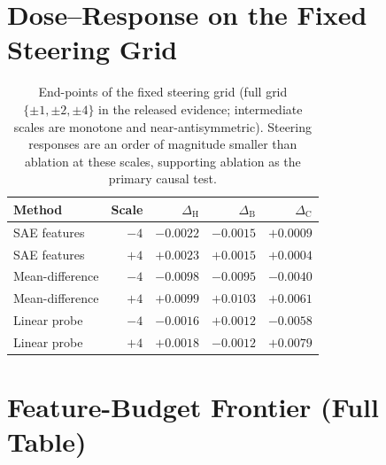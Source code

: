 \documentclass[11pt]{article}
\newcommand{\dH}{\ensuremath{\Delta_{\mathrm{H}}}}
\newcommand{\dB}{\ensuremath{\Delta_{\mathrm{B}}}}
\newcommand{\dC}{\ensuremath{\Delta_{\mathrm{C}}}}
\begin{document}
\section{Dose--Response on the Fixed Steering Grid}
\label{app:dose}

\begin{table}[h]
\centering
\footnotesize
\setlength{\tabcolsep}{4pt}
\begin{tabular}{@{}lrrrr@{}}
\toprule
Method & Scale & \dH{} & \dB{} & \dC{} \\
\midrule
SAE features & $-4$ & $-0.0022$ & $-0.0015$ & $+0.0009$ \\
SAE features & $+4$ & $+0.0023$ & $+0.0015$ & $+0.0004$ \\
Mean-difference & $-4$ & $-0.0098$ & $-0.0095$ & $-0.0040$ \\
Mean-difference & $+4$ & $+0.0099$ & $+0.0103$ & $+0.0061$ \\
Linear probe & $-4$ & $-0.0016$ & $+0.0012$ & $-0.0058$ \\
Linear probe & $+4$ & $+0.0018$ & $-0.0012$ & $+0.0079$ \\
\bottomrule
\end{tabular}
\caption{End-points of the fixed steering grid (full grid
$\{\pm1,\pm2,\pm4\}$ in the released evidence; intermediate scales are
monotone and near-antisymmetric).  Steering responses are an order of
magnitude smaller than ablation at these scales, supporting ablation as the
primary causal test.}
\label{tab:dose}
\end{table}

\section{Feature-Budget Frontier (Full Table)}
\label{app:budget}
\end{document}
